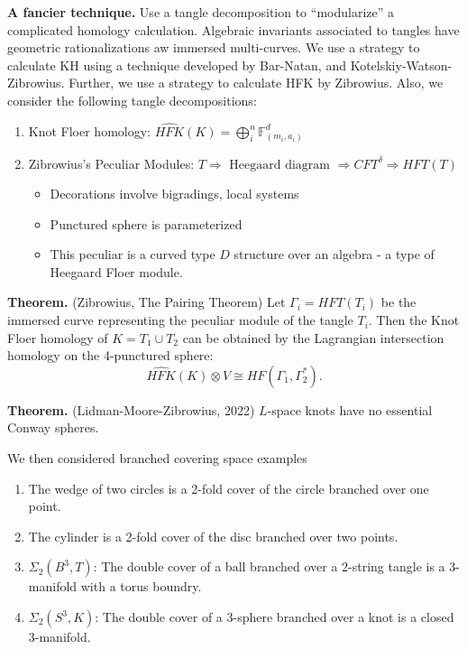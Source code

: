 \documentclass[12pt]{amsart}
\theoremstyle{definition}
\begin{document}
\begin{onehalfspace}
        \noindent\textbf{A fancier technique.} Use a tangle decomposition to ``modularize'' a complicated homology
        calculation.
        Algebraic invariants associated to tangles have geometric rationalizations aw immersed multi-curves.
        We use a strategy to calculate KH using a technique developed by Bar-Natan, and Kotelskiy-Watson-Zibrowius.
        Further, we use a strategy to calculate HFK by Zibrowius.
        Also, we consider the following tangle decompositions:
        \begin{enumerate}
            \item Knot Floer homology: $\widehat{HFK}(K) = \bigoplus_i^n \mathbb{F}_{(m_i,a_i)}^d$
            \item Zibrowius's Peculiar Modules: $T \Rightarrow \text{ Heegaard diagram } \Rightarrow CFT^\delta \Rightarrow HFT(T)$
            \begin{itemize}
                \item Decorations involve bigradings, local systems
                \item Punctured sphere is parameterized
                \item This peculiar is a curved type $D$ structure over an algebra - a type of Heegaard Floer module.
            \end{itemize}
        \end{enumerate}

        \noindent\textbf{Theorem.} (Zibrowius, The Pairing Theorem) Let $\Gamma_i = HFT(T_i)$ be the immersed curve
        representing the peculiar module of the tangle $T_i$.
        Then the Knot Floer homology of $K = T_1 \cup T_2$ can be obtained by the Lagrangian intersection homology on
        the 4-punctured sphere:
        \begin{displaymath}
            \widehat{HFK}(K) \otimes V \cong HF(\Gamma_1,\Gamma_2^*).
        \end{displaymath}

        \noindent\textbf{Theorem.} (Lidman-Moore-Zibrowius, 2022) $L$-space knots have no essential Conway spheres.

        We then considered branched covering space examples
        \begin{enumerate}
            \item The wedge of two circles is a 2-fold cover of the circle branched over one point.
            \item The cylinder is a 2-fold cover of the disc branched over two points.
            \item $\Sigma_2(B^3,T)$: The double cover of a ball branched over a 2-string tangle is a 3-manifold with
            a torus boundry.
            \item $\Sigma_2(S^3,K)$: The double cover of a 3-sphere branched over a knot is a closed 3-manifold.
        \end{enumerate}


\end{onehalfspace}
\end{document}
